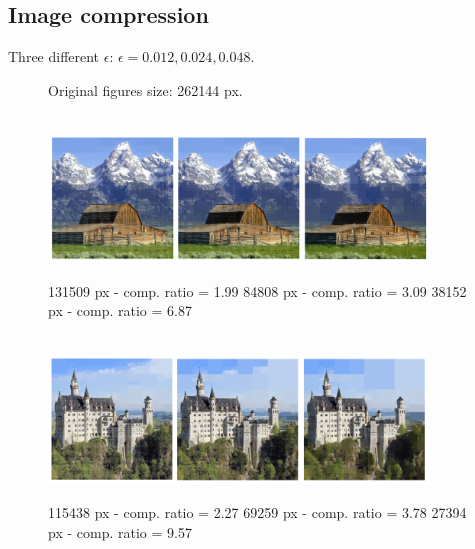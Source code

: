 \documentclass[8pt]{beamer}
\begin{document}
\subsection{Image compression}
\begin{frame}
Three different $\epsilon$: $\epsilon = 0.012, 0.024, 0.048$.
\pause
\begin{center}
 \begin{figure}[!h]
 \begin{footnotesize}
  Original figures size: 262144 px. 
 \end{footnotesize}\\
\includegraphics[width=0.9\textwidth]{./figures/s1_comp_small} \\
\begin{footnotesize}131509 px - comp. ratio = 1.99 \hfill 84808 px - comp. ratio = 3.09 \hfill 38152 px - comp. ratio = 6.87 \end{footnotesize} \\
\pause
\includegraphics[width=0.9\textwidth]{./figures/s2_comp_small}\\
\begin{footnotesize}115438 px - comp. ratio = 2.27 \hfill 69259 px - comp. ratio = 3.78 \hfill 27394 px - comp. ratio = 9.57 \end{footnotesize} \\
\end{figure}
\end{center}
\end{frame}
\end{document}
